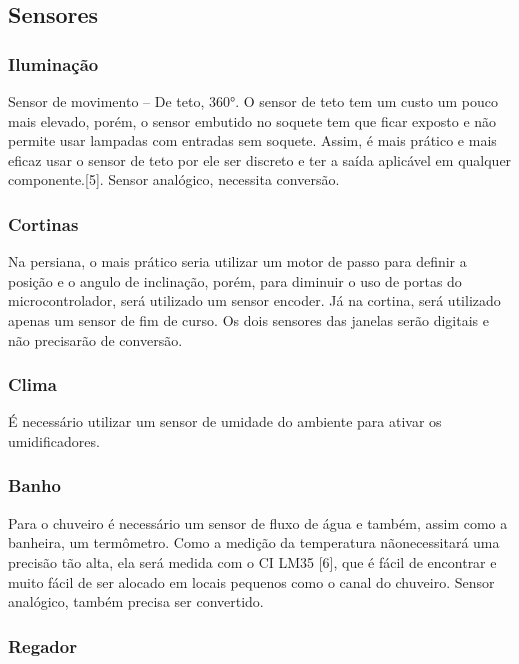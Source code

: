 \subsection{Sensores}

\subsubsection{Iluminação}
	
	Sensor de movimento – De teto, 360°. O sensor de teto tem um custo um pouco mais elevado, porém, o sensor embutido no soquete tem que ficar exposto e não permite usar lampadas com entradas sem soquete. Assim, é mais prático e mais eficaz usar o sensor de teto por ele ser discreto e ter a saída aplicável em qualquer componente.[5]. Sensor analógico, necessita conversão.

\subsubsection{Cortinas}

	Na persiana, o mais prático seria utilizar um motor de passo para definir a posição e o angulo de inclinação, porém, para diminuir o uso de portas do microcontrolador, será utilizado um sensor encoder. Já na cortina, será utilizado apenas um sensor de fim de curso. Os dois sensores das janelas serão digitais e não precisarão de conversão.

\subsubsection{Clima}

	É necessário utilizar um sensor de umidade do ambiente para ativar os umidificadores.
	
\subsubsection{Banho}

	Para o chuveiro é necessário um sensor de fluxo de água e também, assim como a banheira, um termômetro. Como a medição da temperatura nãonecessitará uma precisão tão alta, ela será  medida com o CI LM35 [6], que é fácil de encontrar e muito fácil de ser alocado em locais pequenos como o canal do chuveiro. Sensor analógico, também precisa ser convertido.
	
\subsubsection{Regador}

